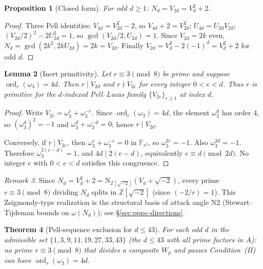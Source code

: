 \documentclass[11pt]{amsart}
\theoremstyle{plain}
\newtheorem{theorem}{Theorem}[section]
\newtheorem{proposition}[theorem]{Proposition}
\newtheorem{lemma}[theorem]{Lemma}
\theoremstyle{definition}
\theoremstyle{remark}
\newtheorem{remark}[theorem]{Remark}
\numberwithin{equation}{section}
\newcommand{\ord}{\operatorname{ord}}
\newcommand{\Z}{\mathbb{Z}}
\newcommand{\F}{\mathbb{F}}
\begin{document}
\begin{proposition}[Closed form]\label{prop:pell-closed-form}
For odd $d \geq 1$: $N_d = V_{2d} = V_d^2 + 2$.
\end{proposition}

\begin{proof}
Three Pell identities: $V_{4d} = V_{2d}^2 - 2$, so $V_{4d} + 2 = V_{2d}^2$; $U_{4d} = U_{2d} V_{2d}$; $(V_{2d}/2)^2 - 2 U_{2d}^2 = 1$, so $\gcd(V_{2d}/2, U_{2d}) = 1$. Since $V_{2d} = 2k$ even, $N_d = \gcd(2k^2, 2 k U_{2d}) = 2k = V_{2d}$. Finally $V_{2d} = V_d^2 - 2(-1)^d = V_d^2 + 2$ for odd $d$.
\end{proof}

\begin{lemma}[Inert primitivity]\label{lem:inert-primitivity}
Let $r \equiv 3 \pmod 8$ be prime and suppose $\ord_r(\omega_3)=4d$. Then $r\mid V_{2d}$ and $r\nmid V_{2e}$ for every integer $0<e<d$. Thus $r$ is primitive for the $d$-indexed Pell--Lucas family $\{V_{2e}\}_{e\geq1}$ at index $d$.
\end{lemma}

\begin{proof}
Write $V_{2e}=\omega_3^e+\omega_3^{-e}$. Since $\ord_r(\omega_3)=4d$, the element $\omega_3^d$ has order $4$, so $(\omega_3^d)^2=-1$ and $\omega_3^d+\omega_3^{-d}=0$; hence $r\mid V_{2d}$.

Conversely, if $r\mid V_{2e}$, then $\omega_3^e+\omega_3^{-e}=0$ in $\F_{r^2}$, so $\omega_3^{2e}=-1$. Also $\omega_3^{2d}=-1$. Therefore $\omega_3^{2(e-d)}=1$, and $4d\mid 2(e-d)$, equivalently $e\equiv d\pmod{2d}$. No integer $e$ with $0<e<d$ satisfies this congruence.
\end{proof}

\begin{remark}\label{rem:zsigmondy}
Since $N_d = V_d^2 + 2 = \mathrm{N}_{\Z[\sqrt{-2}]}(V_d + \sqrt{-2})$, every prime $r \equiv 3 \pmod 8$ dividing $N_d$ splits in $\Z[\sqrt{-2}]$ (since $(-2/r) = 1$). This Zsigmondy-type realization is the structural basis of attack angle N2 (Stewart--Tijdeman bounds on $\omega(N_d)$); see \S\ref{sec:pppc-directions}.
\end{remark}

\begin{theorem}[Pell-sequence exclusion for $d \leq 43$]\label{thm:pell-exclusion}
For each odd $d$ in the admissible set $\{1, 3, 9, 11, 19, 27, 33, 43\}$ (the $d \leq 43$ with all prime factors in $A$): no prime $r \equiv 3 \pmod 8$ that divides a composite $W_p$ and passes Condition~(II) can have $\ord_r(\omega_3) = 4 d$.
\end{theorem}
\end{document}
